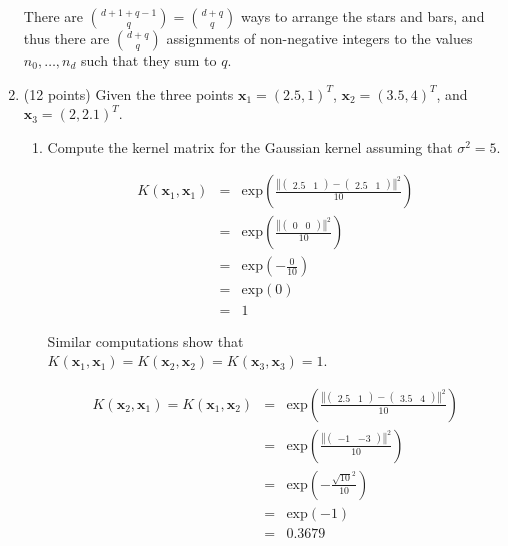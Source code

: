 \documentclass[11pt]{article}
\begin{document}
\begin{enumerate}
There are $\binom{d+1+q-1}{q} = \binom{d+q}{q}$ ways to arrange the stars and bars, and thus there are $\binom{d+q}{q}$ assignments of non-negative integers to the values $n_0,\ldots,n_d$ such that they sum to $q$.

\item (12 points) Given the three points $\mathbf{x}_1 = (2.5, 1)^\mathit{T}$, $\mathbf{x}_2 = (3.5, 4)^\mathit{T}$, and $\mathbf{x}_3 = (2, 2.1)^\mathit{T}$.

\begin{enumerate}
\item Compute the kernel matrix for the Gaussian kernel assuming that $\sigma^2 = 5$.

\begin{eqnarray*}
K(\mathbf{x}_1, \mathbf{x}_1) &=& \text{exp} \left( \frac{\left \Vert \left( \begin{array}{cc} 2.5 & 1 \end{array} \right) - \left( \begin{array}{cc} 2.5 & 1 \end{array} \right) \right \Vert^2}{10} \right) \\ \nonumber
&=& \text{exp} \left( \frac{\left \Vert \left( \begin{array}{cc} 0 & 0 \end{array} \right) \right \Vert^2}{10} \right) \\ \nonumber
&=& \text{exp} \left( - \frac{0}{10} \right) \\ \nonumber
&=& \text{exp} \left( 0 \right) \\
&=& 1 \nonumber
\end{eqnarray*}

Similar computations show that $K(\mathbf{x}_1, \mathbf{x}_1) = K(\mathbf{x}_2, \mathbf{x}_2) = K(\mathbf{x}_3, \mathbf{x}_3) = 1$.

\begin{eqnarray*}
K(\mathbf{x}_2, \mathbf{x}_1) = K(\mathbf{x}_1, \mathbf{x}_2) &=& \text{exp} \left( \frac{\left \Vert \left( \begin{array}{cc} 2.5 & 1 \end{array} \right) - \left( \begin{array}{cc} 3.5 & 4 \end{array} \right) \right \Vert^2}{10} \right) \\ \nonumber
&=& \text{exp} \left( \frac{\left \Vert \left( \begin{array}{cc} -1 & -3 \end{array} \right) \right \Vert^2}{10} \right) \\ \nonumber
&=& \text{exp} \left( - \frac{\sqrt{10}^2}{10} \right) \\ \nonumber
&=& \text{exp} \left( -1 \right) \\ \nonumber
&=& 0.3679
\end{eqnarray*}


\end{enumerate}
\end{enumerate}
\end{document}
